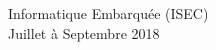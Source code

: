 \begin{titlepage}

{\large Informatique Embarquée (ISEC)}\\[10pt]


{\large Juillet à Septembre 2018}\\[2cm] %


 

\vfill %

\end{titlepage}
